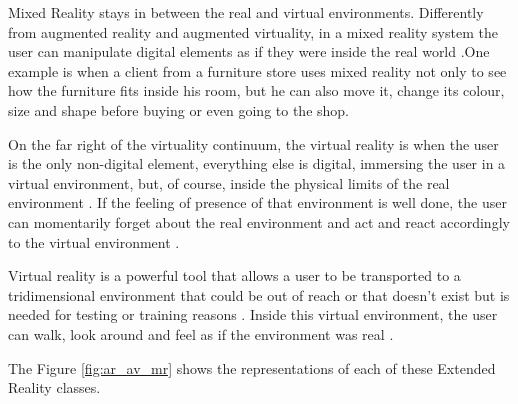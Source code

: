 Mixed Reality stays in between the real and virtual environments. Differently from augmented reality and augmented virtuality, in a mixed reality system the user can manipulate digital elements as if they were inside the real world  \cite{doolani2020review}.One example is when a client from a furniture store uses mixed reality not only to see how the furniture fits inside his room, but he can also move it, change its colour, size and shape before buying or even going to the shop.
    
On the far right of the virtuality continuum, the virtual reality is when the user is the only non-digital element, everything else is digital, immersing the user in a virtual environment, but, of course, inside the physical limits of the real environment \cite{ma2007virtuality}. If the feeling of presence of that environment is well done, the user can momentarily forget about the real environment and act and react accordingly to the virtual environment \cite{farrell2018learning}. 
    
Virtual reality is a powerful tool that allows a user to be transported to a tridimensional environment that could be out of reach or that doesn’t exist but is needed for testing or training reasons \cite{mujber2004virtual}. Inside this virtual environment, the user can walk, look around and feel as if the environment was real \cite{salah2019virtual}.
    
The Figure \ref{fig:ar_av_mr} shows the representations of each of these Extended Reality classes.
    
